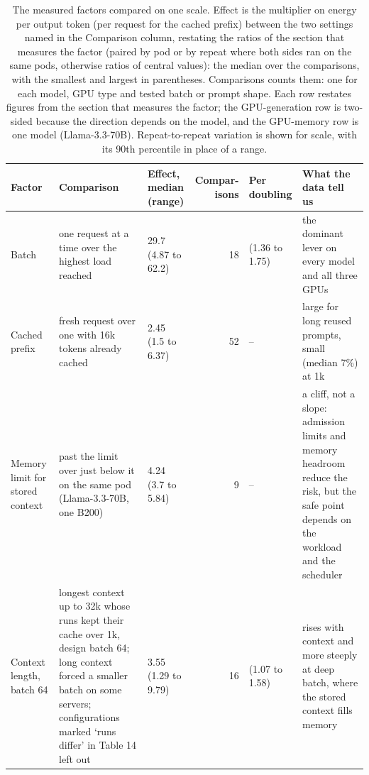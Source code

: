 \begin{landscape}
\begin{table}[p]
\centering
\footnotesize
\setlength{\tabcolsep}{4pt}
\caption{The measured factors compared on one scale. Effect is the multiplier on energy per output token (per request for the cached prefix) between the two settings named in the Comparison column, restating the ratios of the section that measures the factor (paired by pod or by repeat where both sides ran on the same pods, otherwise ratios of central values): the median over the comparisons, with the smallest and largest in parentheses. Comparisons counts them: one for each model, GPU type and tested batch or prompt shape. Each row restates figures from the section that measures the factor; the GPU-generation row is two-sided because the direction depends on the model, and the GPU-memory row is one model (Llama-3.3-70B). Repeat-to-repeat variation is shown for scale, with its 90th percentile in place of a range.}\label{tab:factors}
\begin{tabular}{>{\raggedright\arraybackslash}p{2.5cm}>{\raggedright\arraybackslash}p{6.0cm}lr>{\raggedright\arraybackslash}p{2.7cm}>{\raggedright\arraybackslash}p{4.9cm}}
\toprule
Factor & Comparison & \makecell[l]{Effect, median\\(range)} & \makecell[r]{Compar-\\isons} & \makecell[l]{Per\\doubling} & What the data tell us \\
\midrule
Batch & one request at a time over the highest load reached & 29.7 (4.87 to 62.2) & 18 & 1.53 (1.36 to 1.75) & the dominant lever on every model and all three GPUs \\
Cached prefix & fresh request over one with 16k tokens already cached & 2.45 (1.5 to 6.37) & 52 & -- & large for long reused prompts, small (median 7\%) at 1k \\
Memory limit for stored context & past the limit over just below it on the same pod (Llama-3.3-70B, one B200) & 4.24 (3.7 to 5.84) & 9 & -- & a cliff, not a slope: admission limits and memory headroom reduce the risk, but the safe point depends on the workload and the scheduler \\
Context length, batch 64 & longest context up to 32k whose runs kept their cache over 1k, design batch 64; long context forced a smaller batch on some servers; configurations marked `runs differ' in Table 14 left out & 3.55 (1.29 to 9.79) & 16 & 1.33 (1.07 to 1.58) & rises with context and more steeply at deep batch, where the stored context fills memory \\

\end{tabular}
\end{table}
\end{landscape}
